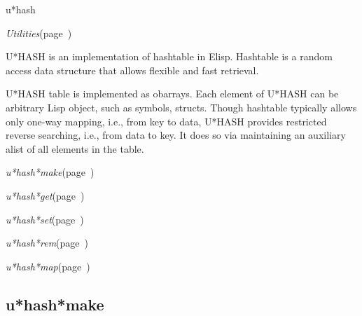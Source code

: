 \begin{description}
\item [Name:]  u*hash

\item [Layer:]
{\sl Utilities}\hfill(page~\pageref{Utilities})

\item [Description:]

U*HASH is an implementation of hashtable in Elisp.
Hashtable is a random access data structure that allows
flexible and fast retrieval.

U*HASH table is implemented as obarrays. Each element of
U*HASH can be arbitrary Lisp object, such as symbols,
structs. Though hashtable typically allows only one-way
mapping, i.e., from key to data, U*HASH provides
restricted reverse searching, i.e., from data to key. It
does so via maintaining an auxiliary alist of all
elements in the table.

\item [Attributes:]

\item [Operations:]
\item {\sl u*hash*make}\hfill(page~\pageref{u*hash*make})
\item {\sl u*hash*get}\hfill(page~\pageref{u*hash*get})
\item {\sl u*hash*set}\hfill(page~\pageref{u*hash*set})
\item {\sl u*hash*rem}\hfill(page~\pageref{u*hash*rem})
\item {\sl u*hash*map}\hfill(page~\pageref{u*hash*map})

\item [Collections:]

\item [Subclasses:]

\item [Superclasses:]

\item [Instances:]



\end{description}
\horizontalline

\subsection{u*hash*make}
\label{u*hash*make}

